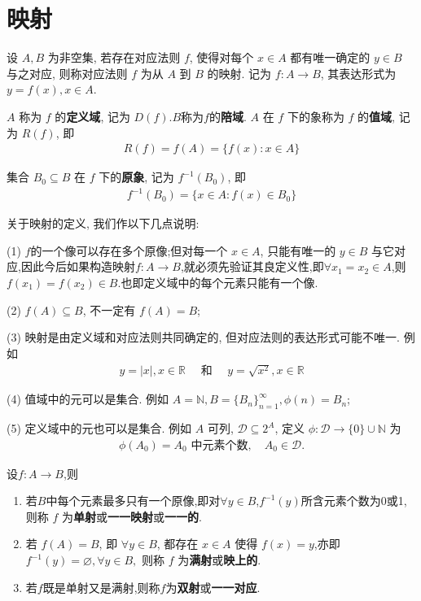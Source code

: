 \documentclass[../../main.tex]{subfiles}%
\begin{document}
\section{映射}

\begin{definition}[映射]
设 $A, B$ 为非空集, 若存在对应法则 $f$, 使得对每个 $x \in A$ 都有唯一确定的 $y \in B$ 与之对应, 则称对应法则 $f$ 为从 $A$ 到 $B$ 的映射. 记为 $f : A \to B$, 其表达形式为 $y = f(x), x \in A$.

$A$ 称为 $f$ 的\textbf{定义域}, 记为 $D(f)$.$B$称为$f$的\textbf{陪域}.
$A$ 在 $f$ 下的象称为 $f$ 的\textbf{值域}, 记为 $R(f)$, 即
\begin{align*}
R(f) = f(A) = \{f(x) : x \in A\}
\end{align*}

集合 $B_0 \subseteq B$ 在 $f$ 下的\textbf{原象}, 记为 $f^{-1}(B_0)$, 即
\begin{align*}
f^{-1}(B_0) = \{x \in A : f(x) \in B_0\}
\end{align*}
\end{definition}
\begin{remark}
关于映射的定义, 我们作以下几点说明:

(1) $f$的一个像可以存在多个原像;但对每一个 $x \in A$, 只能有唯一的 $y \in B$ 与它对应,因此今后如果构造映射$f:A\to B$,就必须先验证其良定义性,即$\forall x_1=x_2\in A$,则$f(x_1)=f(x_2)\in B$.也即定义域中的每个元素只能有一个像.

(2) $f(A) \subseteq B$, 不一定有 $f(A) = B$;

(3) 映射是由定义域和对应法则共同确定的, 但对应法则的表达形式可能不唯一. 例如
\begin{align*}
y = |x|, x \in \mathbb{R} \quad \text{ 和 } \quad y = \sqrt{x^2}, x \in \mathbb{R}
\end{align*}

(4) 值域中的元可以是集合. 例如 $A = \mathbb{N}, B = \{B_n\}_{n = 1}^{\infty}, \phi(n) = B_n$;

(5) 定义域中的元也可以是集合. 例如 $A$ 可列, $\mathcal{D} \subseteq 2^A$, 定义 $\phi : \mathcal{D} \to \{0\} \cup \mathbb{N}$ 为
\begin{align*}
\phi(A_0) = A_0 \text{ 中元素个数}, \quad A_0 \in \mathcal{D}.
\end{align*} 
\end{remark}

\begin{definition}[单射、满射和双射]
设$f:A\to B$,则
\begin{enumerate}
\item 若$B$中每个元素最多只有一个原像,即对$\forall y\in B$,$f^{-1}(y)$所含元素个数为0或1,则称 $f$ 为\textbf{单射}或\textbf{一一映射}或\textbf{一一的}.

\item 若 $f(A) = B$, 即 $\forall y \in B$, 都存在 $x \in A$ 使得 $f(x) = y$,亦即$f^{-1}(y)=\varnothing ,\forall y\in B,$ 则称 $f$ 为\textbf{满射}或\textbf{映上的}.

\item 若$f$既是单射又是满射,则称$f$为\textbf{双射}或\textbf{一一对应}.
\end{enumerate}
\end{definition}
\end{document}
